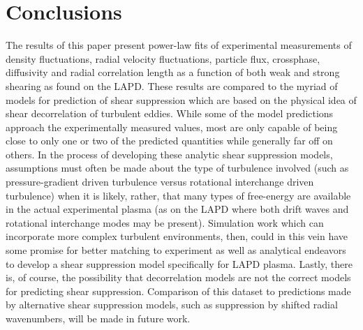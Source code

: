 \documentclass[aip,pop,amsmath,amssymb,reprint,superscriptaddress]{revtex4-1} %
\begin{document}
\section{Conclusions}

The results of this paper present power-law fits of experimental measurements of density fluctuations, radial velocity fluctuations, particle flux, crossphase, diffusivity and radial correlation length as a function of both weak and strong shearing as found on the LAPD. These results are compared to the myriad of models for prediction of shear suppression which are based on the physical idea of shear decorrelation of turbulent eddies. While some of the model predictions approach the experimentally measured values, most are only capable of being close to only one or two of the predicted quantities while generally far off on others. In the process of developing these analytic shear suppression models, assumptions must often be made about the type of turbulence involved (such as pressure-gradient driven turbulence versus rotational interchange driven turbulence) when it is likely, rather, that many types of free-energy are available in the actual experimental plasma (as on the LAPD where both drift waves and rotational interchange modes may be present). Simulation work which can incorporate more complex turbulent environments, then, could in this vein have some promise for better matching to experiment as well as analytical endeavors to develop a shear suppression model specifically for LAPD plasma. Lastly, there is, of course, the possibility that decorrelation models are not the correct models for predicting shear suppression. Comparison of this dataset to predictions made by alternative shear suppression models, such as suppression by shifted radial wavenumbers\cite{stabler}, will be made in future work.
\end{document}
